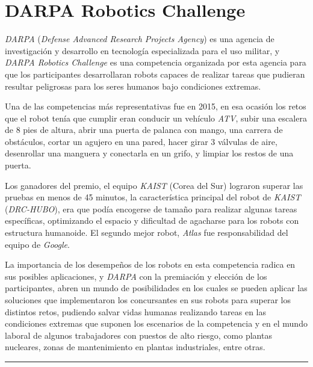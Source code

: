 \documentclass[a4paper, 12pt]{article}
\begin{document}
\section*{DARPA Robotics Challenge}
\emph{DARPA} (\emph{Defense Advanced Research Projects Agency}) es una agencia
de investigación y desarrollo en tecnología especializada para el uso militar, y
\emph{DARPA Robotics Challenge} es una competencia organizada por esta agencia
para que los participantes desarrollaran robots capaces de realizar tareas
que pudieran resultar peligrosas para los seres humanos bajo condiciones extremas.

Una de las competencias más representativas fue en 2015, en esa ocasión los retos
que el robot tenía que cumplir eran conducir un vehículo \emph{ATV}, subir una
escalera de 8 pies de altura, abrir una puerta de palanca con mango, una carrera
de obstáculos, cortar un agujero en una pared, hacer girar 3 válvulas de aire,
desenrollar una manguera y conectarla en un grifo, y limpiar los restos de una
puerta.

Los ganadores del premio, el equipo \emph{KAIST} (Corea del Sur) lograron superar
las pruebas en menos de 45 minutos, la característica principal del robot de
\emph{KAIST} (\emph{DRC-HUBO}), era que podía encogerse de tamaño para realizar
algunas tareas específicas, optimizando el espacio y dificultad de agacharse para
los robots con estructura humanoide. El segundo mejor robot, \emph{Atlas} fue
responsabilidad del equipo de \emph{Google}.

La importancia de los desempeños de los robots en esta competencia radica en sus
posibles aplicaciones, y \emph{DARPA} con la premiación y elección de los
participantes, abren un mundo de posibilidades en los cuales se pueden aplicar las
soluciones que implementaron los concursantes en sus robots para superar los
distintos retos, pudiendo salvar vidas humanas realizando tareas en las condiciones
extremas que suponen los escenarios de la competencia y en el mundo laboral de
algunos trabajadores con puestos de alto riesgo, como plantas nucleares, zonas de
mantenimiento en plantas industriales, entre otras.\\

\hrule



\nocite{*}
\end{document}
